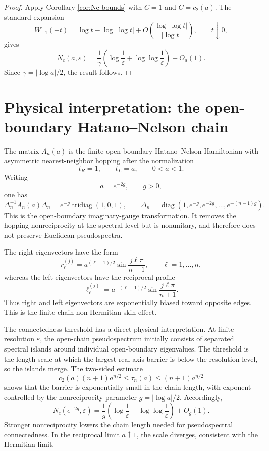 \documentclass[11pt]{amsart}
\numberwithin{equation}{section}
\DeclareMathOperator{\tridiag}{tridiag}
\DeclareMathOperator{\diag}{diag}
\newcommand{\eps}{\varepsilon}
\begin{document}
\begin{proof}
Apply Corollary \ref{cor:Nc-bounds} with \(C=1\) and \(C=c_2(a)\).  The standard expansion
\[
W_{-1}(-t)
=
\log t-\log|\log t|+O\!\left(\frac{\log|\log t|}{|\log t|}\right),
\qquad t\downarrow0,
\]
gives
\[
N_c(a,\eps)
=
\frac1\gamma
\left(
\log\frac1\eps+\log\log\frac1\eps
\right)
+
O_a(1).
\]
Since \(\gamma=|\log a|/2\), the result follows.
\end{proof}

\section{Physical interpretation: the open-boundary Hatano--Nelson chain}

The matrix \(A_n(a)\) is the finite open-boundary Hatano--Nelson Hamiltonian with asymmetric nearest-neighbor hopping after the normalization
\[
t_R=1,
\qquad
t_L=a,
\qquad 0<a<1.
\]
Writing
\[
a=e^{-2g},
\qquad g>0,
\]
one has
\[
\Delta_n^{-1}A_n(a)\Delta_n
=
e^{-g}\tridiag(1,0,1),
\qquad
\Delta_n=\diag(1,e^{-g},e^{-2g},\dots,e^{-(n-1)g}).
\]
This is the open-boundary imaginary-gauge transformation.  It removes the hopping nonreciprocity at the spectral level but is nonunitary, and therefore does not preserve Euclidean pseudospectra.

The right eigenvectors have the form
\[
r^{(j)}_\ell
=
a^{(\ell-1)/2}\sin\frac{j\ell\pi}{n+1},
\qquad
\ell=1,\dots,n,
\]
whereas the left eigenvectors have the reciprocal profile
\[
\ell^{(j)}_\ell
=
a^{-(\ell-1)/2}\sin\frac{j\ell\pi}{n+1}.
\]
Thus right and left eigenvectors are exponentially biased toward opposite edges.  This is the finite-chain non-Hermitian skin effect.

The connectedness threshold has a direct physical interpretation.  At finite resolution \(\eps\), the open-chain pseudospectrum initially consists of separated spectral islands around individual open-boundary eigenvalues.  The threshold is the length scale at which the largest real-axis barrier is below the resolution level, so the islands merge.  The two-sided estimate
\[
c_2(a)(n+1)a^{n/2}
\le
\tau_n(a)
\le
(n+1)a^{n/2}
\]
shows that the barrier is exponentially small in the chain length, with exponent controlled by the nonreciprocity parameter \(g=|\log a|/2\).  Accordingly,
\[
N_c(e^{-2g},\eps)
=
\frac1g
\left(
\log\frac1\eps+\log\log\frac1\eps
\right)
+
O_g(1).
\]
Stronger nonreciprocity lowers the chain length needed for pseudospectral connectedness.  In the reciprocal limit \(a\uparrow1\), the scale diverges, consistent with the Hermitian limit.
\end{document}
